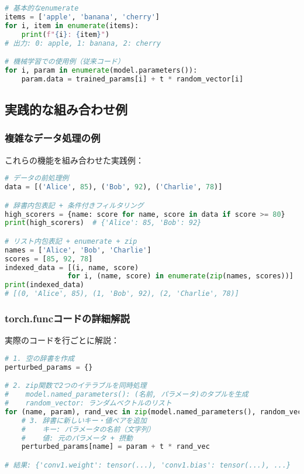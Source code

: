 \documentclass{ltjsarticle}      %
\begin{document}
\begin{lstlisting}[language=Python]
# 基本的なenumerate
items = ['apple', 'banana', 'cherry']
for i, item in enumerate(items):
    print(f"{i}: {item}")
# 出力: 0: apple, 1: banana, 2: cherry

# 機械学習での使用例（従来コード）
for i, param in enumerate(model.parameters()):
    param.data = trained_params[i] + t * random_vector[i]
\end{lstlisting}

\subsection{実践的な組み合わせ例}

\subsubsection{複雑なデータ処理の例}
これらの機能を組み合わせた実践例：

\begin{lstlisting}[language=Python]
# データの前処理例
data = [('Alice', 85), ('Bob', 92), ('Charlie', 78)]

# 辞書内包表記 + 条件付きフィルタリング
high_scorers = {name: score for name, score in data if score >= 80}
print(high_scorers)  # {'Alice': 85, 'Bob': 92}

# リスト内包表記 + enumerate + zip
names = ['Alice', 'Bob', 'Charlie']
scores = [85, 92, 78]
indexed_data = [(i, name, score) 
               for i, (name, score) in enumerate(zip(names, scores))]
print(indexed_data)
# [(0, 'Alice', 85), (1, 'Bob', 92), (2, 'Charlie', 78)]
\end{lstlisting}

\subsubsection{torch.funcコードの詳細解説}
実際のコードを行ごとに解説：

\begin{lstlisting}[language=Python]
# 1. 空の辞書を作成
perturbed_params = {}

# 2. zip関数で2つのイテラブルを同時処理
#    model.named_parameters(): (名前, パラメータ)のタプルを生成
#    random_vector: ランダムベクトルのリスト
for (name, param), rand_vec in zip(model.named_parameters(), random_vector):
    # 3. 辞書に新しいキー・値ペアを追加
    #    キー: パラメータの名前（文字列）
    #    値: 元のパラメータ + 摂動
    perturbed_params[name] = param + t * rand_vec

# 結果: {'conv1.weight': tensor(...), 'conv1.bias': tensor(...), ...}
\end{lstlisting}
\end{document}
